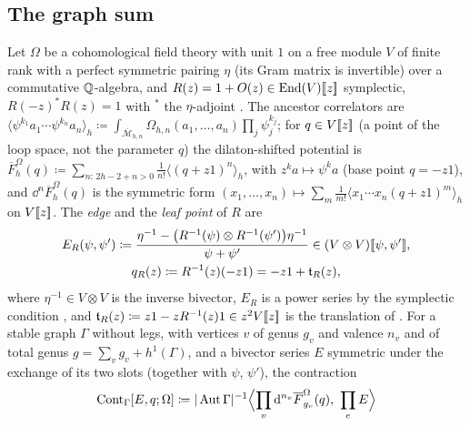 \subsection{The graph sum}
\label{sec:set-graph}

\begin{defn}
\label{def:set-graphsum}
Let $\Omega$ be a cohomological field theory with unit $1$ \cite[Def.~0.3]{PPZ15} on a free module $V$ of finite rank with a perfect symmetric pairing $\eta$ (its Gram matrix is invertible) over a commutative $\mathbb{Q}$-algebra, and $R(z)=1+O(z)\in\operatorname{End}(V)[\![ z ]\!]$ symplectic, $R(-z)^*R(z)=1$ with ${}^*$ the $\eta$-adjoint \cite[(5)]{PPZ15}. The ancestor correlators are $\langle\psi^{k_1}a_1\cdots\psi^{k_n}a_n\rangle_h\coloneqq\int_{\overline{\mathcal M}_{h,n}}\Omega_{h,n}(a_1,\dots,a_n)\prod_j\psi_j^{k_j}$; for $q\in V[\![ z ]\!]$ (a point of the loop space, not the parameter $q$) the dilaton-shifted potential is $\overline F^\Omega_h(q)\coloneqq\sum_{n:\,2h-2+n>0}\frac1{n!}\langle(q+z1)^n\rangle_h$, with $z^ka\mapsto\psi^ka$ (base point $q=-z1$), and $\dd^n\overline F^\Omega_h(q)$ is the symmetric form $(x_1,\dots,x_n)\mapsto\sum_m\frac1{m!}\langle x_1\cdots x_n(q+z1)^m\rangle_h$ on $V[\![ z ]\!]$. The \emph{edge} and the \emph{leaf point} of $R$ are
\begin{gather*}
E_R(\psi,\psi')\coloneqq\frac{\eta^{-1}-\bigl(R^{-1}(\psi)\otimes R^{-1}(\psi')\bigr)\eta^{-1}}{\psi+\psi'}\in(V\otimes V)[\![ \psi,\psi' ]\!],\\
q_R(z)\coloneqq R^{-1}(z)(-z1)=-z1+\mathfrak{t}_R(z),
\end{gather*}
where $\eta^{-1}\in V\otimes V$ is the inverse bivector, $E_R$ is a power series by the symplectic condition \cite[Rem.~2.1, (6)]{PPZ15}, and $\mathfrak{t}_R(z)\coloneqq z1-zR^{-1}(z)1\in z^2V[\![ z ]\!]$ is the translation of \cite[Def.~2.13]{PPZ15}. For a stable graph $\Gamma$ without legs, with vertices $v$ of genus $g_v$ and valence $n_v$ and of total genus $g=\sum_vg_v+h^1(\Gamma)$, and a bivector series $E$ symmetric under the exchange of its two slots (together with $\psi$, $\psi'$), the contraction
\[
\mathrm{Cont}_\Gamma[E,q;\Omega]\coloneqq|\operatorname{Aut}\Gamma|^{-1}\Bigl\langle\prod_v\mathrm{d}^{n_v}\overline F^\Omega_{g_v}(q),\ \prod_eE\Bigr\rangle
\]

\end{defn}
